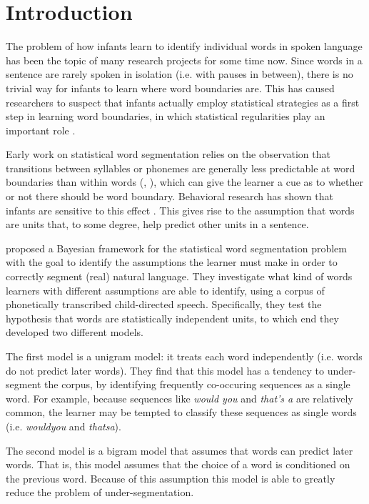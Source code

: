 \section{Introduction}
The problem of how infants learn to identify individual words in spoken language has been the topic of many research projects for some time now. Since words in a sentence are rarely spoken in isolation (i.e. with pauses in between), there is no trivial way for infants to learn where word boundaries are. This has caused researchers to suspect that infants actually employ statistical strategies as a first step in learning word boundaries, in which statistical regularities play an important role \cite{thiessen2003cues}.

Early work on statistical word segmentation relies on the observation that transitions between syllables or phonemes are generally less predictable at word boundaries than within words (\cite{harris1970phoneme}, \cite{saffran1996statistical}), which can give the learner a cue as to whether or not there should be word boundary. Behavioral research has shown that infants are sensitive to this effect \cite{saffran1996statistical} \cite{aslin1998computation}. This gives rise to the assumption that words are units that, to some degree, help predict other units in a sentence.

\cite{Goldwater200921} proposed a Bayesian framework for the statistical word segmentation problem with the goal to identify the assumptions the learner must make in order to correctly segment (real) natural language. They investigate what kind of words learners with different assumptions are able to identify, using a corpus of phonetically transcribed child-directed speech. Specifically, they test the hypothesis that words are statistically independent units, to which end they developed two different models.

The first model is a unigram model: it treats each word independently (i.e. words do not predict later words). They find that this model has a tendency to under-segment the corpus, by identifying frequently co-occuring sequences as a single word. For example, because sequences like \textit{would you} and \textit{that's a} are relatively common, the learner may be tempted to classify these sequences as single words (i.e. \textit{wouldyou} and \textit{thatsa}).

The second model is a bigram model that assumes that words can predict later words. That is, this model assumes that the choice of a word is conditioned on the previous word. Because of this assumption this model is able to greatly reduce the problem of under-segmentation.


